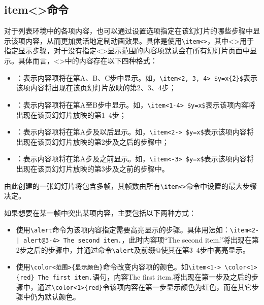 \subsection{item<>命令}

对于列表环境中的各项内容，也可以通过设置选项指定在该幻灯片的哪些步骤中显示该项内容，从而更加灵活地定制动画效果。具体是使用\texttt{\textbackslash{}item<>}，其中<>用于指定显示步骤，对于没有指定<>显示范围的内容项默认会在所有幻灯片页面中显示。具体而言，<>中的内容存在以下四种格式：
\begin{itemize}
    \item <A,B,C>：表示内容项将在第A、B、C步中显示。如，\texttt{\textbackslash{}item<2, 3, 4> \$y=x\^\{2\}\$}表示该项内容将出现在该页幻灯片放映的第2、3、4步；
    \item <A-B>：表示内容项将在第A至B步中显示。如，\texttt{\textbackslash{}item<1-4> \$y=x\$}表示该项内容将出现在该页幻灯片放映的第1~4步；
    \item <A->：表示内容项将在第A步及以后显示。如，\texttt{\textbackslash{}item<2-> \$y=x\$}表示该项内容将出现在该页幻灯片放映的第2步及之后的步骤中；
    \item <-A>：表示内容项将在第A步及之前显示。如，\texttt{\textbackslash{}item<-3> \$y=x\$}表示该项内容将出现在该页幻灯片放映的第3步及之前的步骤中。
\end{itemize}

由此创建的一张幻灯片将包含多帧，其帧数由所有\texttt{\textbackslash{}item<>}命令中设置的最大步骤决定。

如果想要在某一帧中突出某项内容，主要包括以下两种方式：
\begin{itemize}
    \item 使用\texttt{\textbackslash{}alert}命令为该项内容指定需要高亮显示的步骤。具体用法如：\texttt{\textbackslash{}item<2-| alert@3-4> The second item.}，此时内容项“The second item.”将出现在第2步之后的步骤中，并通过命令\texttt{\textbackslash{}alert}及前缀@使其在第3~4步中高亮显示。
    \item 使用\texttt{\textbackslash{}color<范围>\{显示颜色\}}命令改变内容项的颜色。如\texttt{\textbackslash{}item<1-> \textbackslash{}color<1>\{red\} The first item.}语句，内容The first item.将出现在第一步及之后的步骤中，通过\texttt{\textbackslash{}color<1>\{red\}}令该项内容在第一步显示颜色为红色，而在其它步骤中仍为默认颜色。
\end{itemize}

